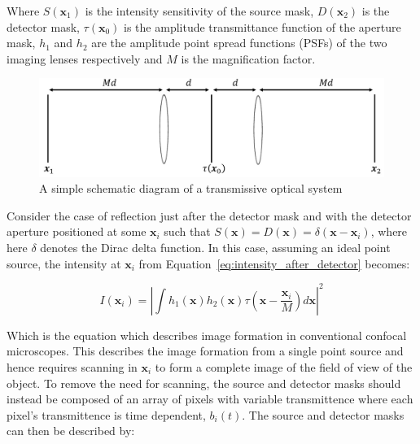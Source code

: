 Where $S\left(\textbf{x}_{1}\right)$ is the intensity 
sensitivity of the source mask, $D\left(\textbf{x}_{2}\right)$ 
is the detector mask, $\tau\left(\textbf{x}_{0}\right)$ is 
the amplitude transmittance function of the aperture mask, 
$h_{1}$ and $h_{2}$ are the amplitude point spread functions 
(PSFs) of the two imaging lenses respectively and $M$ is the 
magnification factor. 

\begin{figure}[h]
	\centering
	\includegraphics[width=\textwidth]{images/optical_system_schematic.jpg}
	\caption{A simple schematic diagram of a transmissive optical system}
	\label{fig:optical_system_schematic}
\end{figure}

Consider the case of reflection just after the detector mask 
and with the detector aperture positioned at some 
$\textbf{x}_{i}$ such that $S\left(\textbf{x}\right) = 
D\left(\textbf{x}\right) = \delta\left(\textbf{x} - 
\textbf{x}_{i}\right)$, where here $\delta$ denotes the Dirac 
delta function. In this case, assuming an ideal point source, 
the intensity at $\textbf{x}_{i}$ from 
Equation~\ref{eq:intensity_after_detector} becomes:

\begin{equation}\label{eq:confocal_image_form}
	I\left(\textbf{x}_{i}\right) = \left| \int h_{1}\left(\textbf{x}\right) h_{2}\left(\textbf{x}\right) \tau\left(\textbf{x} - \frac{\textbf{x}_{i}}{M}\right)d\textbf{x}\right|^{2}
\end{equation}

Which is the equation which describes image formation in 
conventional confocal microscopes.\cite{wilson1990confocal} 
This describes the image formation from a single point source 
and hence requires scanning in $\textbf{x}_{i}$ to form a 
complete image of the field of view of the object. To remove 
the need for scanning, the source and detector masks should 
instead be composed of an array of pixels with variable 
transmittence where each pixel's transmittence is time 
dependent, $b_{i}\left(t\right)$. The source and detector 
masks can then be described by:

